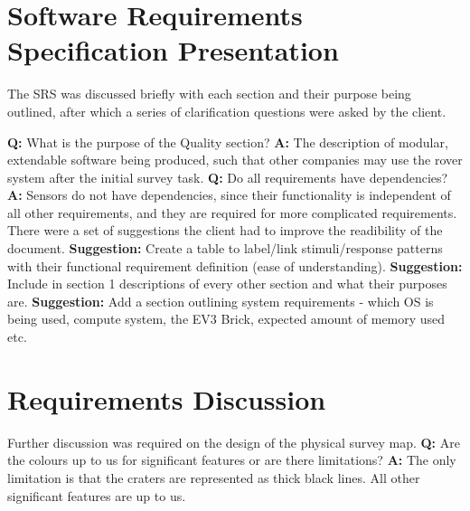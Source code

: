 \documentclass{article}
\begin{document}
\section{Software Requirements Specification Presentation}
The SRS was discussed briefly with each section and their purpose being outlined, after which a series of clarification questions were asked by the client.
\begin{flushleft}
\textbf{Q:} What is the purpose of the Quality section?
\linebreak\textbf{A:} The description of modular, extendable software being produced, such that other companies may use the rover system after the initial survey task.
\linebreak\textbf{Q:} Do all requirements have dependencies?
\linebreak\textbf{A:} Sensors do not have dependencies, since their functionality is independent of all other requirements, and they are required for more complicated requirements.
\linebreak\linebreak
There were a set of suggestions the client had to improve the readibility of the document.
\linebreak\textbf{Suggestion:} Create a table to label/link stimuli/response patterns with their functional requirement definition (ease of understanding).
\linebreak\textbf{Suggestion:} Include in section 1 descriptions of every other section and what their purposes are.
\linebreak\textbf{Suggestion:} Add a section outlining system requirements - which OS is being used, compute system, the EV3 Brick, expected amount of memory used etc.


\section{Requirements Discussion}
Further discussion was required on the design of the physical survey map.
\linebreak\textbf{Q:} Are the colours up to us for significant features or are there limitations?
\linebreak\textbf{A:} The only limitation is that the craters are represented as thick black lines. All other significant features are up to us.
\end{flushleft}
\end{document}
